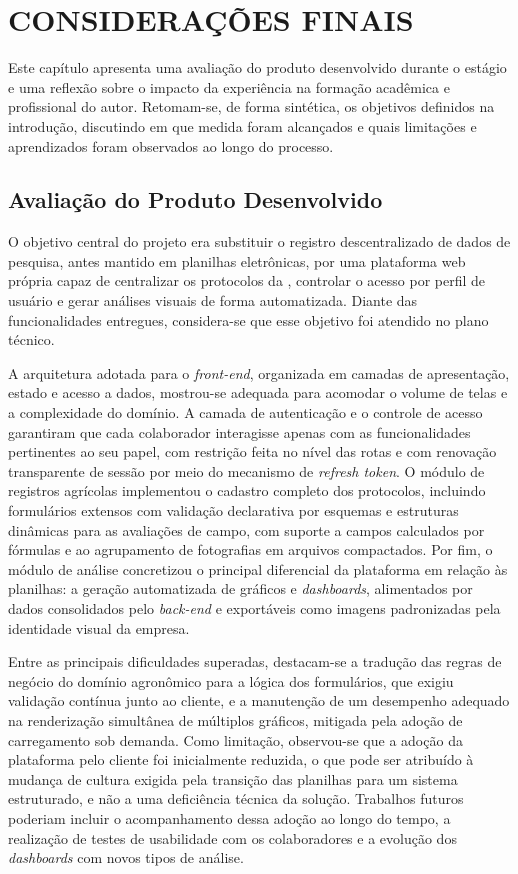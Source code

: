 \chapter{\MakeUppercase{Considerações Finais}}\label{sec:conclusao}

Este capítulo apresenta uma avaliação do produto desenvolvido durante o estágio e uma reflexão sobre o impacto da experiência na formação acadêmica e profissional do autor. Retomam-se, de forma sintética, os objetivos definidos na introdução, discutindo em que medida foram alcançados e quais limitações e aprendizados foram observados ao longo do processo.

\section{Avaliação do Produto Desenvolvido}

O objetivo central do projeto era substituir o registro descentralizado de dados de pesquisa, antes mantido em planilhas eletrônicas, por uma plataforma web própria capaz de centralizar os protocolos da , controlar o acesso por perfil de usuário e gerar análises visuais de forma automatizada. Diante das funcionalidades entregues, considera-se que esse objetivo foi atendido no plano técnico.

A arquitetura adotada para o \textit{front-end}, organizada em camadas de apresentação, estado e acesso a dados, mostrou-se adequada para acomodar o volume de telas e a complexidade do domínio. A camada de autenticação e o controle de acesso garantiram que cada colaborador interagisse apenas com as funcionalidades pertinentes ao seu papel, com restrição feita no nível das rotas e com renovação transparente de sessão por meio do mecanismo de \textit{refresh token}. O módulo de registros agrícolas implementou o cadastro completo dos protocolos, incluindo formulários extensos com validação declarativa por esquemas e estruturas dinâmicas para as avaliações de campo, com suporte a campos calculados por fórmulas e ao agrupamento de fotografias em arquivos compactados. Por fim, o módulo de análise concretizou o principal diferencial da plataforma em relação às planilhas: a geração automatizada de gráficos e \textit{dashboards}, alimentados por dados consolidados pelo \textit{back-end} e exportáveis como imagens padronizadas pela identidade visual da empresa.

Entre as principais dificuldades superadas, destacam-se a tradução das regras de negócio do domínio agronômico para a lógica dos formulários, que exigiu validação contínua junto ao cliente, e a manutenção de um desempenho adequado na renderização simultânea de múltiplos gráficos, mitigada pela adoção de carregamento sob demanda. Como limitação, observou-se que a adoção da plataforma pelo cliente foi inicialmente reduzida, o que pode ser atribuído à mudança de cultura exigida pela transição das planilhas para um sistema estruturado, e não a uma deficiência técnica da solução. Trabalhos futuros poderiam incluir o acompanhamento dessa adoção ao longo do tempo, a realização de testes de usabilidade com os colaboradores e a evolução dos \textit{dashboards} com novos tipos de análise.

